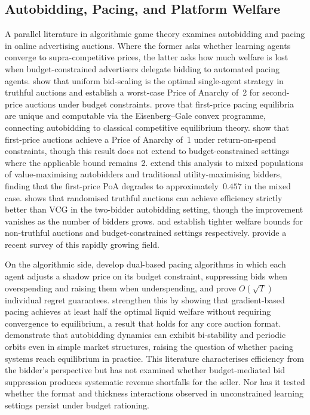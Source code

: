 \subsection{Autobidding, Pacing, and Platform Welfare}

A parallel literature in algorithmic game theory examines autobidding and pacing in online advertising auctions. Where the former asks whether learning agents converge to supra-competitive prices, the latter asks how much welfare is lost when budget-constrained advertisers delegate bidding to automated pacing agents. \citet{Aggarwal2019} show that uniform bid-scaling is the optimal single-agent strategy in truthful auctions and establish a worst-case Price of Anarchy of~2 for second-price auctions under budget constraints. \citet{Conitzer2022FPPE} prove that first-price pacing equilibria are unique and computable via the Eisenberg--Gale convex programme, connecting autobidding to classical competitive equilibrium theory. \citet{Deng2021TowardsEfficient} show that first-price auctions achieve a Price of Anarchy of~1 under return-on-spend constraints, though this result does not extend to budget-constrained settings where the applicable bound remains~2. \citet{Deng2022FPAEfficiency} extend this analysis to mixed populations of value-maximising autobidders and traditional utility-maximising bidders, finding that the first-price PoA degrades to approximately~$0.457$ in the mixed case. \citet{Mehta2022AuctionDesign} shows that randomised truthful auctions can achieve efficiency strictly better than VCG in the two-bidder autobidding setting, though the improvement vanishes as the number of bidders grows. \citet{Liaw2022EfficiencyNonTruthful} and \citet{Liaw2024EfficiencyBudget} establish tighter welfare bounds for non-truthful auctions and budget-constrained settings respectively. \citet{Aggarwal2024Survey} provide a recent survey of this rapidly growing field.

On the algorithmic side, \citet{Balseiro2019Learning} develop dual-based pacing algorithms in which each agent adjusts a shadow price on its budget constraint, suppressing bids when overspending and raising them when underspending, and prove $O(\sqrt{T})$ individual regret guarantees. \citet{Gaitonde2023} strengthen this by showing that gradient-based pacing achieves at least half the optimal liquid welfare without requiring convergence to equilibrium, a result that holds for any core auction format. \citet{PaesLeme2024} demonstrate that autobidding dynamics can exhibit bi-stability and periodic orbits even in simple market structures, raising the question of whether pacing systems reach equilibrium in practice. This literature characterises efficiency from the bidder's perspective but has not examined whether budget-mediated bid suppression produces systematic revenue shortfalls for the seller. Nor has it tested whether the format and thickness interactions observed in unconstrained learning settings persist under budget rationing.

